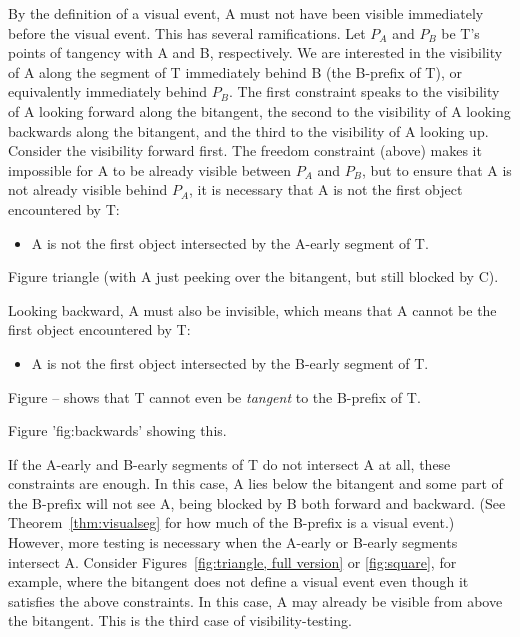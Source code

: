 \documentclass[12pt]{article}
\begin{document}
By the definition of a visual event, A must not have been visible immediately
before the visual event.
This has several ramifications.
Let $P_A$ and $P_B$ be T's points of tangency with A and B, respectively.
We are interested in the visibility of A along the segment of T
immediately behind B (the B-prefix of T), or equivalently immediately behind $P_B$.
The first constraint speaks to the visibility of A looking forward along the bitangent,
the second to the visibility of A looking backwards along the bitangent,
and the third to the visibility of A looking up.
Consider the visibility forward first.
The freedom constraint (above) makes it impossible for A to be already visible between
$P_A$ and $P_B$, but to ensure that A is not already visible behind $P_A$, it is 
necessary that A is not the first object encountered by T:
\begin{itemize}
\item A is not the first object intersected by the A-early segment of T.
\end{itemize}

Figure triangle (with A just peeking over the bitangent, but still blocked by C).

Looking backward, A must also be invisible, 
which means that A cannot be the first object encountered by T:
\begin{itemize}
\item A is not the first object intersected by the B-early segment of T.
\end{itemize}
Figure -- shows that T cannot even be {\em tangent} to the B-prefix of T.

Figure 'fig:backwards' showing this.

If the A-early and B-early segments of T do not intersect A at all, 
these constraints are enough.
In this case, A lies below the bitangent and some part of the B-prefix will not see A,
being blocked by B both forward and backward.
(See Theorem~\ref{thm:visualseg} for how much of the B-prefix is a visual event.)
However, more testing is necessary when the A-early or B-early segments intersect A.
Consider Figures~\ref{fig:triangle, full version} or \ref{fig:square}, for example, 
where the bitangent does not define a visual event even though it satisfies the above 
constraints.
In this case, A may already be visible from above the bitangent.
This is the third case of visibility-testing.
\end{document}
